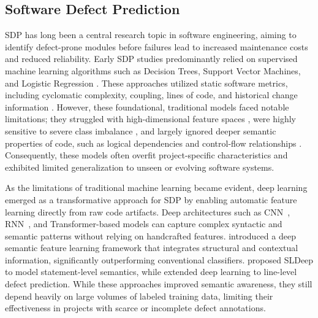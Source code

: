 \documentclass[authoryear,final,5p,times,twocolumn]{elsarticle}
\theoremstyle{plain}
\begin{document}
\subsection{Software Defect Prediction}
SDP has long been a central research topic in software engineering, aiming to identify defect-prone modules before failures lead to increased maintenance costs and reduced reliability. Early SDP studies predominantly relied on supervised machine learning algorithms such as Decision Trees, Support Vector Machines, and Logistic Regression \citep{lessmann2008benchmarking, hall2012systematic}. These approaches utilized static software metrics, including cyclomatic complexity, coupling, lines of code, and historical change information \citep{gray2010software}. However, these foundational, traditional models faced notable limitations; they struggled with high-dimensional feature spaces \citep{elish2008predicting}, were highly sensitive to severe class imbalance \citep{bennin2018mahakil}, and largely ignored deeper semantic properties of code, such as logical dependencies and control-flow relationships \citep{liu2024cfg2at}. Consequently, these models often overfit project-specific characteristics and exhibited limited generalization to unseen or evolving software systems.

As the limitations of traditional machine learning became evident, deep learning emerged as a transformative approach for SDP by enabling automatic feature learning directly from raw code artifacts. Deep architectures such as CNN~\citep{krichen2023cnn_survey}, RNN~\citep{sherstinsky2020fundamentals}, and Transformer-based models can capture complex syntactic and semantic patterns without relying on handcrafted features. \citet{wang2018deep} introduced a deep semantic feature learning framework that integrates structural and contextual information, significantly outperforming conventional classifiers. \citet{majd2020sldeep} proposed SLDeep to model statement-level semantics, while \citet{pornprasit2023deeplinedp} extended deep learning to line-level defect prediction. While these approaches improved semantic awareness, they still depend heavily on large volumes of labeled training data, limiting their effectiveness in projects with scarce or incomplete defect annotations.
\end{document}
